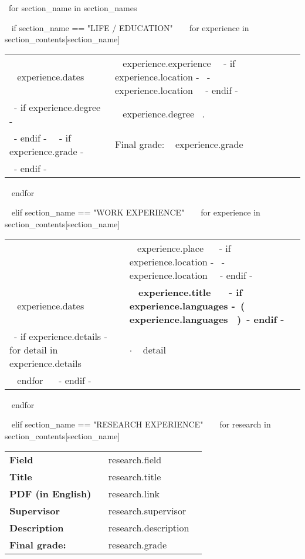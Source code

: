 \documentclass[11pt,english]{article}
\begin{document}
\begin{minipage}{\textwidth}

~{for section_name in section_names}~

~{ if section_name == "LIFE / EDUCATION" }~
  ~{ for experience in section_contents[section_name] }~
    \begin{tabular}{ @{} p{32mm} l @{} }
    {\small ~{{ experience.dates }}~} & {\small ~{{ experience.experience }}~}~{- if experience.location -}~ \small \hspace{1mm}- ~{{ experience.location }}~~{- endif -}~\\
    ~{- if experience.degree -}~
      & \small ~{{ experience.degree }}~.\\
    ~{- endif -}~
    ~{- if experience.grade -}~
      & \small \color{maingrey} Final grade: ~{{ experience.grade }}~\\
    ~{- endif -}~
    \end{tabular}
    \vspace{1mm}
  ~{ endfor }~
  \vspace{2mm}

~{ elif section_name == "WORK EXPERIENCE" }~
  ~{ for experience in section_contents[section_name] }~
    \begin{tabular}{ @{} p{32mm} p{135mm} @{} }
    & \small ~{{ experience.place }}~ ~{- if experience.location -}~ \small \hspace{1mm}- ~{{ experience.location }}~~{- endif -}~\\
    \small ~{{ experience.dates }}~ & \bf\small ~{{ experience.title }}~ ~{- if experience.languages -}~\small\hspace{1mm}\bf\color{maincolor}(~{{ experience.languages }}~)~{- endif -}~\\
    ~{- if experience.details -}~
      ~{ for detail in experience.details }~
        & $\cdot$ \small ~{{ detail }}~ \\
      ~{ endfor }~
    ~{- endif -}~
    \end{tabular}
    \vspace{2mm}
  ~{ endfor }~
  \vspace{20mm}

~{ elif section_name == "RESEARCH EXPERIENCE" }~
  ~{ for research in section_contents[section_name] }~
    \begin{tabular}{ @{} p{32mm} p{135mm} @{} }

    \small \bf Field & \small ~{{ research.field }}~ \\
    \small \bf Title & \small ~{{ research.title }}~ \\
    \small \bf PDF (in English) & \small ~{{ research.link }}~ \\
    \small \bf Supervisor & \small ~{{ research.supervisor }}~ \\
    \small \bf Description & \small ~{{ research.description }}~ \\
    \small \bf \small \color{maingrey} Final grade: & \small \color{maingrey} ~{{ research.grade }}~ \\


\end{tabular}
\end{minipage}
\end{document}
